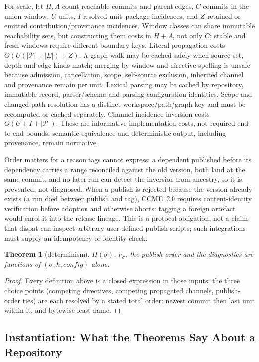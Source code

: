 \documentclass[10pt,conference]{IEEEtran}
\newtheorem{theorem}{Theorem}
\theoremstyle{definition}
\begin{document}
For scale, let $H,A$ count reachable commits and parent edges, $C$ commits in
the union window, $U$ units, $I$ resolved unit--package incidences, and $Z$
retained or emitted contribution/provenance incidences. Window classes can
share immutable reachability sets, but constructing them costs in $H+A$, not
only $C$; stable and fresh windows require different boundary keys.
Literal propagation costs $O(U(|\mathcal P|+|E|)+Z)$. A graph walk may be
cached safely when source set, depth and edge kinds match; merging by window and
directive spelling is unsafe because admission, cancellation, scope,
self-source exclusion, inherited channel and provenance remain per unit.
Lexical parsing may be cached by repository, immutable record, parser/schema
and parsing-configuration identities. Scope and changed-path resolution has a
distinct workspace/path/graph key and must be recomputed or cached separately.
Channel incidence inversion costs $O(U+I+|\mathcal P|)$. These are informative
implementation costs, not required end-to-end bounds; semantic equivalence and
deterministic output, including provenance, remain normative. 

Order matters for a reason tags cannot express: a dependent published
before its dependency carries a range reconciled against the old
version, both land at the same commit, and no later run can detect the
inversion from ancestry, so it is prevented, not diagnosed. When a
publish is rejected because the version already exists (a run died
between publish and tag), CCME~2.0 requires content-identity verification
before adoption and otherwise aborts: tagging a foreign artefact would enrol
it into the release lineage. This is a protocol obligation, not a claim that
dispat can inspect arbitrary user-defined publish scripts; such integrations
must supply an idempotency or identity check.

\begin{theorem}[determinism]
\label{thm:det}
$\Pi(\sigma)$, $\nu_\sigma$, the publish order and the diagnostics are
functions of $(\sigma, h, \mathit{config})$ alone.
\end{theorem}
\begin{proof}
Every definition above is a closed expression in those inputs; the three
choice points (competing directives, competing propagated channels,
publish-order ties) are each resolved by a stated total order: newest
commit then last unit within it, and bytewise least name.
\end{proof}

\subsection{Instantiation: What the Theorems Say About a Repository}
\label{sec:model:inst}
\end{document}
